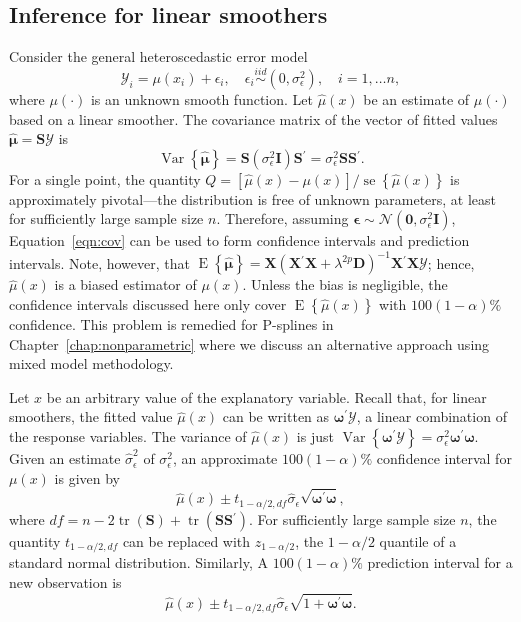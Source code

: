 \documentclass[cmfont,usenames,dvipsnames,leqno]{afit-etd}\usepackage[]{graphicx}\usepackage[]{color}
\newcommand{\trans}{\ensuremath{^\prime}}
\newcommand{\bc}[1]{\ensuremath{\bm{\mathcal{#1}}}}
\newcommand{\mc}[1]{\ensuremath{\mathcal{#1}}}
\newcommand{\wh}[1]{\ensuremath{\widehat{#1}}}
\newcommand{\tquant}[2]{\ensuremath{t_{#1,#2}}}
\newcommand{\E}{\operatorname{E}}
\newcommand{\var}{\operatorname{Var}}
\newcommand{\se}{\operatorname{se}}
\newcommand{\tr}{\operatorname{tr}}
\newcommand{\X}{\ensuremath{\bm{X}}}
\begin{document}
\subsection{Inference for linear smoothers}
\label{sec:pspline-inference}
Consider the general heteroscedastic error model
\begin{equation*}
  \mc{Y}_i = \mu(x_i) + \epsilon_i, \quad \epsilon_i \stackrel{iid}{\sim} (0, \sigma_\epsilon^2), \quad i = 1, \dotsc n,
\end{equation*}
where $\mu(\cdot)$ is an unknown smooth function. Let $\wh{\mu}(x)$ be an estimate of $\mu(\cdot)$ based on a linear smoother. The covariance matrix of the vector of fitted values $\wh{\bm{\mu}} = \bm{S}\bc{Y}$ is 
\begin{equation}
\label{eqn:cov}
  \var\left\{\wh{\bm{\mu}}\right\} = \bm{S}\left( \sigma_\epsilon^2\bm{I} \right) \bm{S}\trans = \sigma_\epsilon^2   \bm{S}\bm{S}\trans.
\end{equation}
For a single point, the quantity $Q = \left[ \wh{\mu}(x) - \mu(x) \right]/\se\left\{ \wh{\mu}(x) \right\}$ is approximately pivotal---the distribution is free of unknown parameters, at least for sufficiently large sample size $n$. Therefore, assuming $\bm{\epsilon} \sim \mc{N}(\bm{0}, \sigma_\epsilon^2\bm{I})$, Equation~\eqref{eqn:cov} can be used to form confidence intervals and prediction intervals. Note, however, that $\E\left\{\wh{\bm{\mu}}\right\} = \X\left( \X\trans\X + \lambda^{2p}\bm{D} \right)^{-1}\X\trans\X\bc{Y}$; hence, $\wh{\mu}(x)$ is a biased estimator of $\mu(x)$. Unless the bias is negligible, the confidence intervals discussed here only cover $\E\left\{\wh{\mu}(x)\right\}$ with $100(1 - \alpha)\%$ confidence. This problem is remedied for \acp{P-spline} in Chapter~\ref{chap:nonparametric} where we discuss an alternative approach using mixed model methodology.  

Let $x$ be an arbitrary value of the explanatory variable. Recall that, for linear smoothers, the fitted value $\wh{\mu}(x)$ can be written as $\bm{\omega}\trans\bc{Y}$, a linear combination of the response variables. The variance of $\wh{\mu}(x)$ is just $\var\left\{\bm{\omega}\trans\bc{Y}\right\} = \sigma_\epsilon^2\bm{\omega}\trans\bm{\omega}$. Given an estimate $\wh{\sigma}_\epsilon^2$ of $\sigma_\epsilon^2$, an approximate $100(1 - \alpha)\%$ confidence interval for $\mu(x)$ is given by 
\begin{equation*}
  \wh{\mu}(x) \pm \tquant{1-\alpha/2}{df} \wh{\sigma}_\epsilon \sqrt{\bm{\omega}\trans\bm{\omega}},
\end{equation*}
where $df = n - 2\tr\left( \bm{S} \right) + \tr\left( \bm{S}\bm{S}\trans \right)$. For sufficiently large sample size $n$, the quantity $\tquant{1-\alpha/2}{df}$ can be replaced with $z_{1-\alpha/2}$, the $1-\alpha/2$ quantile of a standard normal distribution. Similarly, A $100(1-\alpha)\%$ prediction interval for a new observation is 
\begin{equation*}
  \wh{\mu}(x) \pm \tquant{1-\alpha/2}{df} \wh{\sigma}_\epsilon \sqrt{1 + \bm{\omega}\trans\bm{\omega}}.
\end{equation*}
\end{document}
